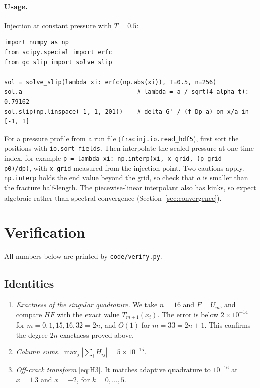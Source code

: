 \documentclass[12pt]{article}
\begin{document}
\paragraph{Usage.} Injection at constant pressure with $T=0.5$:
\begin{lstlisting}[numbers=none]
import numpy as np
from scipy.special import erfc
from gc_slip import solve_slip

sol = solve_slip(lambda xi: erfc(np.abs(xi)), T=0.5, n=256)
sol.a                                # lambda = a / sqrt(4 alpha t): 0.79162
sol.slip(np.linspace(-1, 1, 201))    # delta G' / (f Dp a) on x/a in [-1, 1]
\end{lstlisting}
For a pressure profile from a run file (\texttt{fracinj.io.read\_hdf5}), first
sort the positions with \texttt{io.sort\_fields}. Then interpolate the scaled
pressure at one time index, for example
\texttt{p = lambda xi: np.interp(xi, x\_grid, (p\_grid - p0)/dp)}, with
\texttt{x\_grid} measured from the injection point. Two cautions apply.
\texttt{np.interp} holds the end value beyond the grid, so check that $a$ is
smaller than the fracture half-length. The piecewise-linear interpolant also
has kinks, so expect algebraic rather than spectral convergence
(Section~\ref{sec:convergence}).

\section{Verification}\label{sec:verification}

All numbers below are printed by \texttt{code/verify.py}.

\subsection{Identities}
\begin{enumerate}
	\item \emph{Exactness of the singular quadrature.} We take $n=16$ and
	      $F=U_m$, and compare $HF$ with the exact value $T_{m+1}(x_i)$. The
	      error is below $2\times10^{-14}$ for $m = 0, 1, 15, 16, 32 = 2n$, and
	      $O(1)$ for $m = 33 = 2n+1$. This confirms the degree-$2n$ exactness proved
	      above.
	\item \emph{Column sums.} $\max_j|\sum_i H_{ij}| = 5\times10^{-15}$.
	\item \emph{Off-crack transform} \eqref{eq:H3}. It matches adaptive
	      quadrature to $10^{-16}$ at $x=1.3$ and $x=-2$, for $k=0,\dots,5$.
\end{enumerate}
\end{document}
